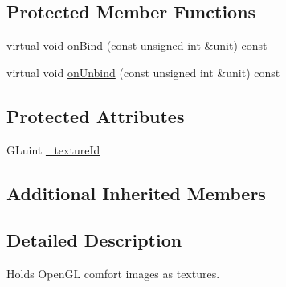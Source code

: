 \subsection*{Protected Member Functions}
\begin{DoxyCompactItemize}
\item 
virtual void \hyperlink{classburn_1_1_texture_a41cf19a71e61bb8ddfd6bf93d1c0ef02}{on\-Bind} (const unsigned int \&unit) const 
\item 
virtual void \hyperlink{classburn_1_1_texture_a1a2a5e886e044ac83fa575916129884f}{on\-Unbind} (const unsigned int \&unit) const 
\end{DoxyCompactItemize}
\subsection*{Protected Attributes}
\begin{DoxyCompactItemize}
\item 
G\-Luint \hyperlink{classburn_1_1_texture_a03d6a7665e62581007271195df866aaa}{\-\_\-texture\-Id}
\end{DoxyCompactItemize}
\subsection*{Additional Inherited Members}


\subsection{Detailed Description}
Holds Open\-G\-L comfort images as textures. 

